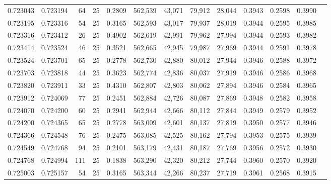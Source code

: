 \begin{tabular}{rrrrrrrrrrrrr}
0.723043 & 0.723194 &    64 &  25 &                                     0.2809 & 562,539 &  43,071 &  79,912 &  28,044 & 0.3943 & 0.2598 & 0.3990 \\
0.723195 & 0.723316 &    54 &  25 &                                     0.3165 & 562,593 &  43,017 &  79,937 &  28,019 & 0.3944 & 0.2595 & 0.3985 \\
0.723316 & 0.723412 &    26 &  25 &                                     0.4902 & 562,619 &  42,991 &  79,962 &  27,994 & 0.3944 & 0.2593 & 0.3982 \\
0.723414 & 0.723524 &    46 &  25 &                                     0.3521 & 562,665 &  42,945 &  79,987 &  27,969 & 0.3944 & 0.2591 & 0.3978 \\
0.723524 & 0.723701 &    65 &  25 &                                     0.2778 & 562,730 &  42,880 &  80,012 &  27,944 & 0.3946 & 0.2588 & 0.3972 \\
0.723703 & 0.723818 &    44 &  25 &                                     0.3623 & 562,774 &  42,836 &  80,037 &  27,919 & 0.3946 & 0.2586 & 0.3968 \\
0.723820 & 0.723911 &    33 &  25 &                                     0.4310 & 562,807 &  42,803 &  80,062 &  27,894 & 0.3946 & 0.2584 & 0.3965 \\
0.723912 & 0.724069 &    77 &  25 &                                     0.2451 & 562,884 &  42,726 &  80,087 &  27,869 & 0.3948 & 0.2582 & 0.3958 \\
0.724070 & 0.724200 &    60 &  25 &                                     0.2941 & 562,944 &  42,666 &  80,112 &  27,844 & 0.3949 & 0.2579 & 0.3952 \\
0.724200 & 0.724365 &    65 &  25 &                                     0.2778 & 563,009 &  42,601 &  80,137 &  27,819 & 0.3950 & 0.2577 & 0.3946 \\
0.724366 & 0.724548 &    76 &  25 &                                     0.2475 & 563,085 &  42,525 &  80,162 &  27,794 & 0.3953 & 0.2575 & 0.3939 \\
0.724549 & 0.724768 &    94 &  25 &                                     0.2101 & 563,179 &  42,431 &  80,187 &  27,769 & 0.3956 & 0.2572 & 0.3930 \\
0.724768 & 0.724994 &   111 &  25 &                                     0.1838 & 563,290 &  42,320 &  80,212 &  27,744 & 0.3960 & 0.2570 & 0.3920 \\
0.725003 & 0.725157 &    54 &  25 &                                     0.3165 & 563,344 &  42,266 &  80,237 &  27,719 & 0.3961 & 0.2568 & 0.3915 \\

\end{tabular}
